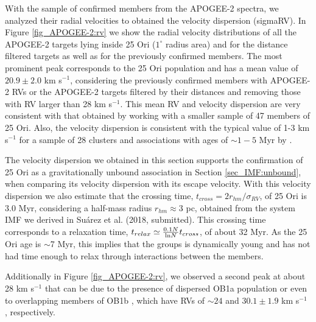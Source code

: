 \documentclass[12pt]{article}
\newcounter{subsubsubsection}[subsubsection]
\begin{document}
\label{sec_APOGEE-2:rv_dispersion}
With the sample of confirmed members from the APOGEE-2 spectra, we analyzed their radial velocities to obtained the velocity dispersion (\ac{sigmaRV}). In Figure \ref{fig_APOGEE-2:rv} we show the radial velocity distributions of all the APOGEE-2 targets lying inside 25 Ori ($1^\circ$ radius area) and for the distance filtered targets as well as for the previously confirmed members. The most prominent peak corresponds to the 25 Ori population and has a mean value of $20.9\pm2.0$ km s$^{-1}$, considering the previously confirmed members with APOGEE-2 RVs or the APOGEE-2 targets filtered by their distances and removing those with RV larger than 28 km s$^{-1}$. This mean RV and velocity dispersion are very consistent with that obtained by \citet[$19.7\pm1.7$ km s$^{-1}$; ][ and references therein]{Briceno2007} working with a smaller sample of 47 members of 25 Ori. Also, the velocity dispersion is consistent with the typical value of 1-3 km s$^{-1}$ for a sample of 28 clusters and associations with ages of $\sim1-5$ Myr by \citet{Kuhn2018}. 

The velocity dispersion we obtained in this section supports the confirmation of 25 Ori as a gravitationally unbound association in Section \ref{sec_IMF:unbound}, when comparing its velocity dispersion with its escape velocity. With this velocity dispersion we also estimate that the crossing time, $t_{cross}=2r_{hm}/\sigma_{RV}$, of 25 Ori is $3.0$ Myr, considering a half-mass radius $r_{hm}\approx3$ pc, obtained from the system IMF we derived in Su\'arez et al. (2018, submitted). This crossing time corresponds to a relaxation time, $t_{relax}\simeq\frac{0.1N}{\textnormal{ln}N}t_{cross}$, of about 32 Myr. As the 25 Ori age is $\sim$7 Myr, this implies that the groups is dynamically young and has not had time enough to relax through interactions between the members.

Additionally in Figure \ref{fig_APOGEE-2:rv}, we observed a second peak at about 28 km s$^{-1}$ that can be due to the presence of dispersed OB1a population or even to overlapping members of OB1b \citep[Orion C and D; ][]{Kounkel2018}, which have RVs of $\sim24$ \citep{Jeffries2006} and $30.1\pm1.9$ km s$^{-1}$ \citep{Briceno2007}, respectively.
\end{document}
